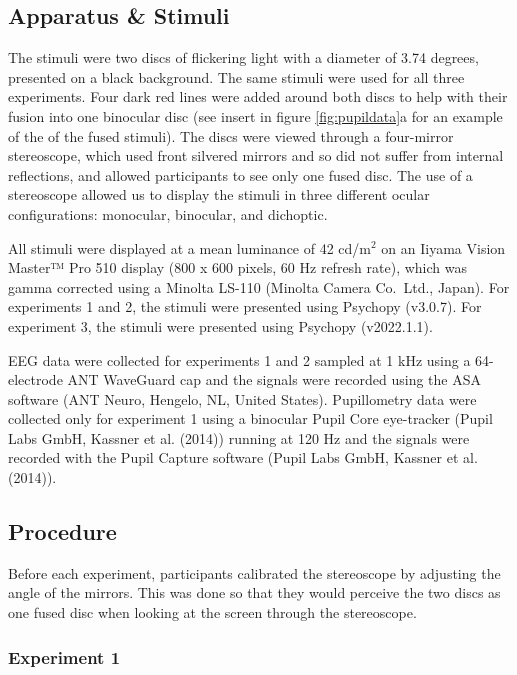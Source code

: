 \documentclass[
]{article}
\begin{document}
\hypertarget{apparatus-stimuli}{%
\subsection{Apparatus \& Stimuli}\label{apparatus-stimuli}}

The stimuli were two discs of flickering light with a diameter of 3.74 degrees, presented on a black background. The same stimuli were used for all three experiments. Four dark red lines were added around both discs to help with their fusion into one binocular disc (see insert in figure \ref{fig:pupildata}a for an example of the of the fused stimuli). The discs were viewed through a four-mirror stereoscope, which used front silvered mirrors and so did not suffer from internal reflections, and allowed participants to see only one fused disc. The use of a stereoscope allowed us to display the stimuli in three different ocular configurations: monocular, binocular, and dichoptic.

All stimuli were displayed at a mean luminance of 42 cd/m\(^2\) on an Iiyama Vision Master™ Pro 510 display (800 x 600 pixels, 60 Hz refresh rate), which was gamma corrected using a Minolta LS-110 (Minolta Camera Co.~Ltd., Japan). For experiments 1 and 2, the stimuli were presented using Psychopy (v3.0.7). For experiment 3, the stimuli were presented using Psychopy (v2022.1.1).

EEG data were collected for experiments 1 and 2 sampled at 1 kHz using a 64-electrode ANT WaveGuard cap and the signals were recorded using the ASA software (ANT Neuro, Hengelo, NL, United States). Pupillometry data were collected only for experiment 1 using a binocular Pupil Core eye-tracker (Pupil Labs GmbH, Kassner et al. (2014)) running at 120 Hz and the signals were recorded with the Pupil Capture software (Pupil Labs GmbH, Kassner et al. (2014)).

\hypertarget{procedure}{%
\subsection{Procedure}\label{procedure}}

Before each experiment, participants calibrated the stereoscope by adjusting the angle of the mirrors. This was done so that they would perceive the two discs as one fused disc when looking at the screen through the stereoscope.

\hypertarget{experiment-1}{%
\subsubsection{Experiment 1}\label{experiment-1}}
\end{document}
